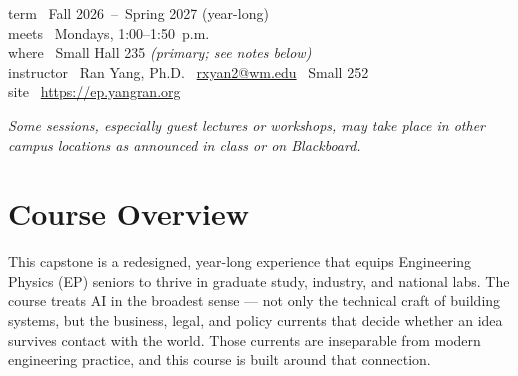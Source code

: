 \documentclass[11pt, letterpaper]{article}
\begin{document}
\addto{}


\begin{infocard}
term       \textbar\ Fall 2026~--~Spring 2027 (year-long)\\
meets      \textbar\ Mondays, 1:00--1:50~p.m.\\
where      \textbar\ Small Hall 235 \textit{\ttfamily(primary; see notes below)}\\
instructor \textbar\ Ran Yang, Ph.D. \textbar\ \href{mailto:rxyan2@wm.edu}{rxyan2@wm.edu} \textbar\ Small 252\\
site       \textbar\ \url{https://ep.yangran.org}
\end{infocard}

\vspace{0.5ex}
{\footnotesize\itshape\color{labMauveDark}Some sessions, especially guest lectures or workshops, may take place in other campus locations as announced in class or on Blackboard.}

\section{Course Overview}
This capstone is a redesigned, year-long experience that equips Engineering Physics (EP) seniors to thrive in graduate study, industry, and national labs. The course treats AI in the broadest sense --- not only the technical craft of building systems, but the business, legal, and policy currents that decide whether an idea survives contact with the world. Those currents are inseparable from modern engineering practice, and this course is built around that connection.
\end{document}
